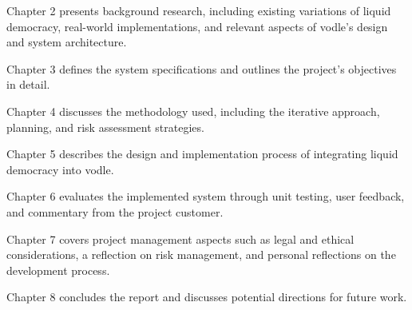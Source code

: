 Chapter 2 presents background research, including existing variations of liquid democracy, real-world implementations, and relevant aspects of vodle's design and system architecture.

Chapter 3 defines the system specifications and outlines the project's objectives in detail.

Chapter 4 discusses the methodology used, including the iterative approach, planning, and risk assessment strategies.

Chapter 5 describes the design and implementation process of integrating liquid democracy into vodle.

Chapter 6 evaluates the implemented system through unit testing, user feedback, and commentary from the project customer.

Chapter 7 covers project management aspects such as legal and ethical considerations, a reflection on risk management, and personal reflections on the development process.

Chapter 8 concludes the report and discusses potential directions for future work.